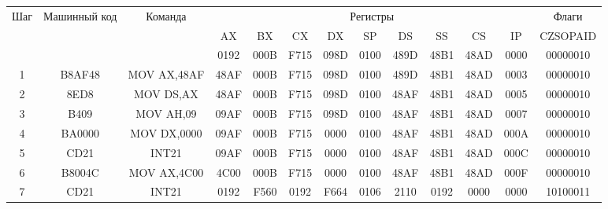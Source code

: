 \begin{tabular}{|c|c|c|c|c|c|c|c|c|c|c|c|c|}
\hline
	Шаг & Машинный код & Команда & \multicolumn{9}{|c|}{Регистры} & Флаги \\
	& & & AX & BX & CX & DX & SP & DS & SS & CS & IP & CZSOPAID \\

\hline
	& & & 0192 & 000B & F715 & 098D & 0100 & 489D & 48B1 & 48AD & 0000 & 00000010 \\
\hline
	1 & B8AF48 & MOV AX,48AF & 48AF & 000B & F715 & 098D & 0100 & 489D & 48B1 & 48AD & 0003 & 00000010 \\
\hline
	2 & 8ED8 & MOV DS,AX & 48AF & 000B & F715 & 098D & 0100 & 48AF & 48B1 & 48AD & 0005 & 00000010 \\
\hline
	3 & B409 & MOV AH,09 & 09AF & 000B & F715 & 098D & 0100 & 48AF & 48B1 & 48AD & 0007 & 00000010 \\
\hline
	4 & BA0000 & MOV DX,0000 & 09AF & 000B & F715 & 0000 & 0100 & 48AF & 48B1 & 48AD & 000A & 00000010 \\
\hline
	5 & CD21 & INT21 & 09AF & 000B & F715 & 0000 & 0100 & 48AF & 48B1 & 48AD & 000C & 00000010 \\
\hline
	6 & B8004C & MOV AX,4C00 & 4C00 & 000B & F715 & 0000 & 0100 & 48AF & 48B1 & 48AD & 000F & 00000010 \\
\hline
	7 & CD21 & INT21 & 0192 & F560 & 0192 & F664 & 0106 & 2110 & 0192 & 0000 & 0000 & 10100011 \\
\hline
\end{tabular}
